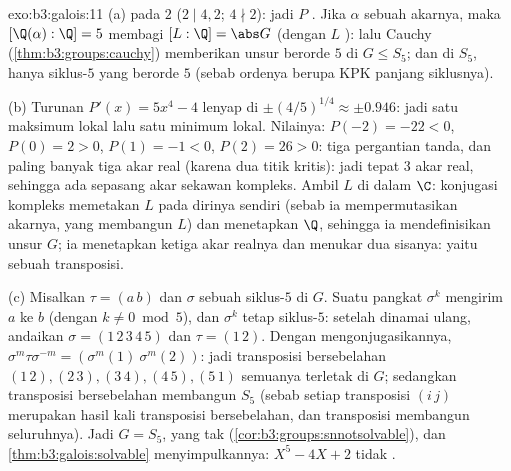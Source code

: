 \begin{solution}{exo:b3:galois:11}
(a)  pada $2$ ($2 \mid 4, 2$; $4 \nmid 2$): jadi $P$
. Jika $\alpha$ sebuah akarnya, maka $[\Q(\alpha):\Q] = 5$
membagi $[L:\Q] = \abs G$ (dengan $L$ ): lalu Cauchy
(\cref{thm:b3:groups:cauchy}) memberikan unsur berorde $5$ di
$G \leq S_5$; dan di $S_5$, hanya siklus-$5$ yang berorde $5$ (sebab ordenya
berupa KPK panjang siklusnya).

(b) Turunan $P'(x) = 5x^4 - 4$ lenyap di $\pm(4/5)^{1/4} \approx \pm
0.946$: jadi satu maksimum lokal lalu satu minimum lokal. Nilainya: $P(-2)
= -22 < 0$, $P(0) = 2 > 0$, $P(1) = -1 < 0$, $P(2) = 26 > 0$:
tiga pergantian tanda, dan paling banyak tiga akar real (karena dua titik
kritis): jadi tepat $3$ akar real, sehingga ada sepasang akar
sekawan kompleks. Ambil  $L$ di dalam $\C$:
konjugasi kompleks memetakan $L$ pada dirinya sendiri (sebab ia mempermutasikan akarnya,
yang membangun $L$) dan menetapkan $\Q$, sehingga ia mendefinisikan unsur
$G$; ia menetapkan ketiga akar realnya dan menukar dua sisanya: yaitu
sebuah transposisi.

(c) Misalkan $\tau = (a\,b)$ dan $\sigma$ sebuah siklus-$5$ di $G$. Suatu
pangkat $\sigma^k$ mengirim $a$ ke $b$ (dengan $k \ne 0 \bmod 5$), dan
$\sigma^k$ tetap siklus-$5$: setelah dinamai ulang, andaikan $\sigma =
(1\,2\,3\,4\,5)$ dan $\tau = (1\,2)$. Dengan mengonjugasikannya,
$\sigma^m\tau\sigma^{-m} = (\sigma^m(1)\ \sigma^m(2))$: jadi
transposisi bersebelahan $(1\,2), (2\,3), (3\,4), (4\,5),
(5\,1)$ semuanya terletak di $G$; sedangkan transposisi bersebelahan membangun $S_5$
(sebab setiap transposisi $(i\,j)$ merupakan hasil kali transposisi bersebelahan,
dan transposisi membangun seluruhnya). Jadi $G = S_5$, yang tak 
(\cref{cor:b3:groups:snnotsolvable}), dan
\cref{thm:b3:galois:solvable} menyimpulkannya: $X^5 - 4X + 2$ tidak
.
\end{solution}

